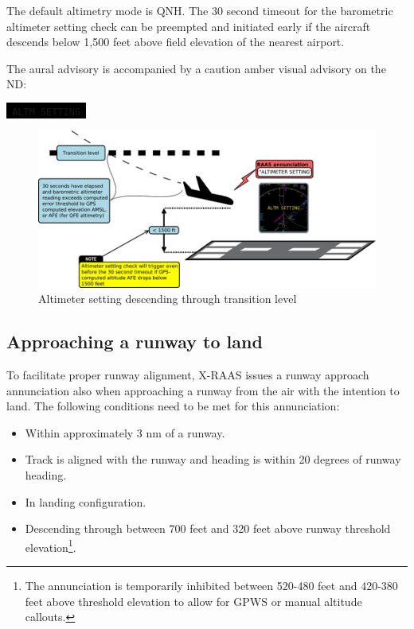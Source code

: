 \documentclass[a4paper,12pt]{article}
\newcommand{\visualadvisory}[3][b]{%
    \ifthenelse{\equal{#1}{b}}{\begin{center}}{}
    \noindent
    \colorbox{black}{\textcolor{#2visualadvisorycolor}{\large\texttt{~#3~}}}
    \ifthenelse{\equal{#1}{b}}{\end{center}}{}}
\begin{document}
\noindent The default altimetry mode is QNH. The 30 second timeout for
the barometric altimeter setting check can be preempted and initiated
early if the aircraft descends below 1,500 feet above field elevation of
the nearest airport.

The aural advisory is accompanied by a caution amber visual advisory on
the ND:

\visualadvisory{nonroutine}{ALTM SETTING}

\begin{figure}[H]
\begin{center}
\includegraphics[width=\textwidth]{../src/alt_setting_des.pdf}
\end{center}
\caption{Altimeter setting descending through transition level}
\end{figure}

\subsection{Approaching a runway to land}
\label{subsec:ApchAirMon}

To facilitate proper runway alignment, X-RAAS issues a runway approach
annunciation also when approaching a runway from the air with the
intention to land. The following conditions need to be met for this
annunciation:

\begin{itemize}

\item Within approximately 3 nm of a runway.

\item Track is aligned with the runway and heading is within 20 degrees
of runway heading.

\item In landing configuration.

\item Descending through between 700 feet and 320 feet above runway
threshold elevation\footnote{The annunciation is temporarily inhibited
between 520-480 feet and 420-380 feet above threshold elevation to allow
for GPWS or manual altitude callouts.}.

\end{itemize}
\end{document}
